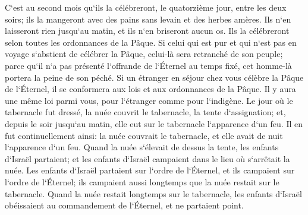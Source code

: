 \verse C`est au second mois qu`ils la célébreront, le quatorzième jour, entre les deux soirs; ils la mangeront avec des pains sans levain et des herbes amères. 
\verse Ils n`en laisseront rien jusqu`au matin, et ils n`en briseront aucun os. Ils la célébreront selon toutes les ordonnances de la Pâque. 
\verse Si celui qui est pur et qui n`est pas en voyage s`abstient de célébrer la Pâque, celui-là sera retranché de son peuple; parce qu`il n`a pas présenté l`offrande de l`Éternel au temps fixé, cet homme-là portera la peine de son péché. 
\verse Si un étranger en séjour chez vous célèbre la Pâque de l`Éternel, il se conformera aux lois et aux ordonnances de la Pâque. Il y aura une même loi parmi vous, pour l`étranger comme pour l`indigène. 
\verse Le jour où le tabernacle fut dressé, la nuée couvrit le tabernacle, la tente d`assignation; et, depuis le soir jusqu`au matin, elle eut sur le tabernacle l`apparence d`un feu. 
\verse Il en fut continuellement ainsi: la nuée couvrait le tabernacle, et elle avait de nuit l`apparence d`un feu. 
\verse Quand la nuée s`élevait de dessus la tente, les enfants d`Israël partaient; et les enfants d`Israël campaient dans le lieu où s`arrêtait la nuée. 
\verse Les enfants d`Israël partaient sur l`ordre de l`Éternel, et ils campaient sur l`ordre de l`Éternel; ils campaient aussi longtemps que la nuée restait sur le tabernacle. 
\verse Quand la nuée restait longtemps sur le tabernacle, les enfants d`Israël obéissaient au commandement de l`Éternel, et ne partaient point. 
